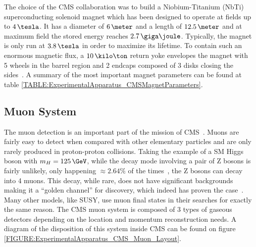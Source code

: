 The choice of the \gls{CMS} collaboration was to build a Niobium-Titanium (NbTi) superconducting solenoid magnet which has been designed to operate at fields up to $4\,\tesla$. It has a diameter of $6\,\meter$ and a length of $12.5\,\meter$ and at maximum field the stored energy reaches $2.7\,\giga\joule$. Typically, the magnet is only run at $3.8\,\tesla$ in order to maximize its lifetime. To contain such an enormous magnetic flux, a $10\,\kilo\ton$ return yoke envelopes the magnet with 5 wheels in the barrel region and 2 endcaps composed of 3 disks closing the sides~\cite{ARTICLE:TheCMSExperiment}. A summary of the most important magnet parameters can be found at table \ref{TABLE:ExperimentalApparatus_CMSMagnetParameters}.



\subsection{Muon System}
\label{SUBSECTION:ExperimentalApparatus_CMS_Moun}


The muon detection is an important part of the mission of \gls{CMS}~\cite{CMSTDR:CMSMuonSystem}. Muons are fairly easy to detect when compared with other elementary particles and are only rarely produced in proton-proton collisions. Taking the example of a \gls{SM} Higgs boson with $m_H=125\,\GeV$, while the decay mode involving a pair of Z bosons is fairly unlikely, only happening $\approx 2.64\%$ of the times~\cite{ARTICLE:PDG2014}, the Z bosons can decay into 4 muons. This decay, while rare, does not have significant backgrounds making it a ``golden channel'' for discovery, which indeed has proven the case~\cite{ARTICLE:CMSHiggsObservation}. Many other models, like \gls{SUSY}, use muon final states in their searches for exactly the same reason. The \gls{CMS} muon system is composed of 3 types of gaseous detectors depending on the location and momentum reconstruction needs. A diagram of the disposition of this system inside \gls{CMS} can be found on figure \ref{FIGURE:ExperimentalApparatus_CMS_Muon_Layout}.

